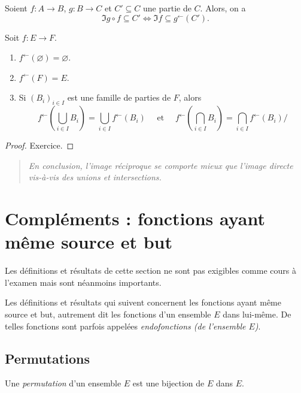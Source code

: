 \begin{exemple}
Soient $f : A\to B$,  $g : B\to C$ et $C'\subseteq C$ une partie de $C$. Alors, on a 
\[\Im g\circ f \subseteq C' \iff \Im f \subseteq g^\leftarrow(C').\]
\end{exemple}

\begin{proposition}
Soit $f : E\to F$.
\begin{enumerate}
\item $f^\leftarrow(\varnothing)=\varnothing$.
\item $f^\leftarrow(F)=E$.
\item Si $(B_i)_{i\in I}$ est une famille de parties de $F$, alors 
\[
f^\leftarrow\left(\bigcup_{i\in I}B_i\right) 
= \bigcup_{i\in I} f^\leftarrow(B_i)
\quad \text{ et } \quad 
f^\leftarrow\left(\bigcap_{i\in I}B_i\right) 
= \bigcap_{i\in I} f^\leftarrow(B_i)/
\]
\end{enumerate}
\end{proposition}
\begin{proof} Exercice.
\end{proof}

\begin{quote}
\emph{En conclusion, l'image réciproque se comporte mieux que l'image directe vis-à-vis des unions et intersections.}
\end{quote}


\section{Compléments : fonctions ayant même source et but}

Les définitions et résultats de cette section ne sont pas exigibles comme cours à l'examen mais sont néanmoins importants.

Les définitions et résultats qui suivent concernent les fonctions ayant même source et but, autrement dit les fonctions d'un ensemble $E$ dans lui-même. De telles fonctions sont parfois appelées \emph{endofonctions (de l'ensemble $E$)}.


\subsection{Permutations}

\begin{definition}
Une \emph{permutation} d'un ensemble $E$ est une bijection de $E$ dans $E$. 
\end{definition}

